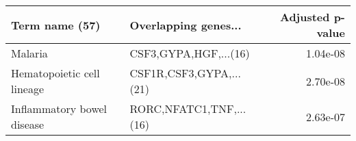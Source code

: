 \begin{tabular}{llr}
\toprule
            Term name (57) &    Overlapping genes... &  Adjusted p-value \\
\midrule
                   Malaria &   CSF3,GYPA,HGF,...(16) &          1.04e-08 \\
Hematopoietic cell lineage & CSF1R,CSF3,GYPA,...(21) &          2.70e-08 \\
Inflammatory bowel disease & RORC,NFATC1,TNF,...(16) &          2.63e-07 \\
\bottomrule
\end{tabular}
